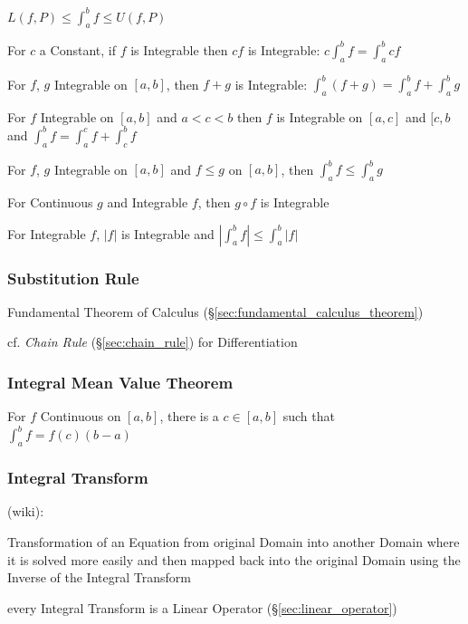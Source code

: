 $L(f,P) \leq \int_a^b f \leq U(f,P)$

For $c$ a Constant, if $f$ is Integrable then $cf$ is Integrable: $c
\int_a^b f = \int_a^b c f$

For $f$, $g$ Integrable on $[a,b]$, then $f + g$ is Integrable:
$\int_a^b (f+g) = \int_a^b f + \int_a^b g$

For $f$ Integrable on $[a,b]$ and $a < c < b$ then $f$ is Integrable
on $[a,c]$ and $[c,b$ and $\int_a^b f = \int_a^c f + \int_c^b f$

For $f$, $g$ Integrable on $[a,b]$ and $f \leq g$ on $[a,b]$, then
$\int_a^b f \leq \int_a^b g$

For Continuous $g$ and Integrable $f$, then $g \circ f$ is Integrable

For Integrable $f$, $|f|$ is Integrable and $|\int_a^b f| \leq
\int_a^b |f|$



\subsubsection{Substitution Rule}\label{sec:substitution_rule}

Fundamental Theorem of Calculus (\S\ref{sec:fundamental_calculus_theorem})

\fist cf. \emph{Chain Rule} (\S\ref{sec:chain_rule}) for Differentiation



\subsubsection{Integral Mean Value Theorem}
\label{sec:integral_mean_value}

For $f$ Continuous on $[a,b]$, there is a $c \in [a,b]$ such that
$\int_a^b f = f(c)(b - a)$



\subsubsection{Integral Transform}\label{sec:integral_transform}

(wiki):

Transformation of an Equation from original Domain into another Domain where it
is solved more easily and then mapped back into the original Domain using the
Inverse of the Integral Transform

every Integral Transform is a Linear Operator (\S\ref{sec:linear_operator})


